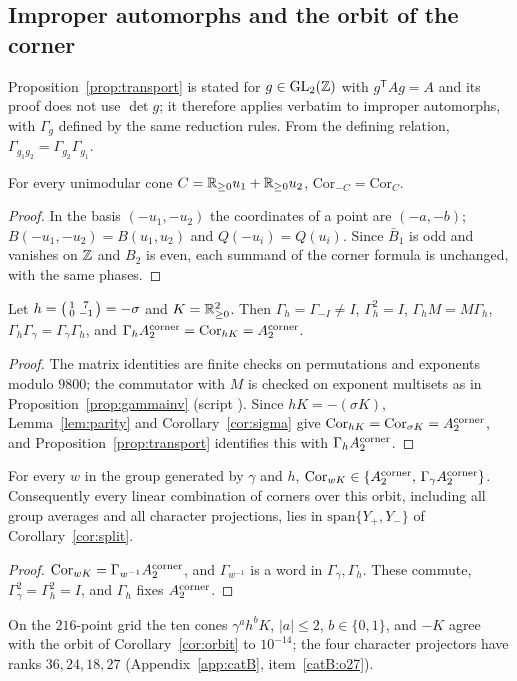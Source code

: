 \subsection{Improper automorphs and the orbit of the corner}\label{sec:improper}
Proposition~\ref{prop:transport} is stated for $g\in\mathrm{GL}_2(\mathbb{Z})$ with $g^{\mathsf T}Ag=A$ and its proof does not use $\det g$; it therefore applies verbatim to improper automorphs, with
$\Gamma_g$ defined by the same reduction rules. From the defining relation, $\Gamma_{g_1g_2}=\Gamma_{g_2}\Gamma_{g_1}$.
\begin{lemma}\label{lem:parity}
For every unimodular cone $C=\mathbb{R}_{\ge0}u_1+\mathbb{R}_{\ge0}u_2$, $\mathrm{Cor}_{-C}=\mathrm{Cor}_C$.
\end{lemma}
\begin{proof}
In the basis $(-u_1,-u_2)$ the coordinates of a point are $(-a,-b)$; $B(-u_1,-u_2)=B(u_1,u_2)$ and $Q(-u_i)=Q(u_i)$. Since $\bar B_1$ is odd and vanishes on $\mathbb{Z}$ and $B_2$ is even, each
summand of the corner formula is unchanged, with the same phases.
\end{proof}
\begin{proposition}\label{prop:improper}
Let $h=\begin{psmallmatrix}1&7\\0&-1\end{psmallmatrix}=-\sigma$ and $K=\mathbb{R}_{\ge0}^2$. Then $\Gamma_h=\Gamma_{-I}\neq I$, $\Gamma_h^2=I$, $\Gamma_hM=M\Gamma_h$, $\Gamma_h\Gamma_\gamma=\Gamma_\gamma\Gamma_h$, and
$\Gamma_h A_2^{\rm corner}=\mathrm{Cor}_{hK}=A_2^{\rm corner}$.
\end{proposition}
\begin{proof}
The matrix identities are finite checks on permutations and exponents modulo $9800$; the commutator with $M$ is checked on exponent multisets as in Proposition~\ref{prop:gammainv}
(script ). Since $hK=-(\sigma K)$, Lemma~\ref{lem:parity} and Corollary~\ref{cor:sigma} give $\mathrm{Cor}_{hK}=\mathrm{Cor}_{\sigma K}=A_2^{\rm corner}$, and
Proposition~\ref{prop:transport} identifies this with $\Gamma_hA_2^{\rm corner}$.
\end{proof}
\begin{corollary}\label{cor:orbit}
For every $w$ in the group generated by $\gamma$ and $h$, $\mathrm{Cor}_{wK}\in\{A_2^{\rm corner},\,\Gamma_\gamma A_2^{\rm corner}\}$. Consequently every linear combination of corners over this
orbit, including all group averages and all character projections, lies in $\mathrm{span}\{Y_+,Y_-\}$ of Corollary~\ref{cor:split}.
\end{corollary}
\begin{proof}
$\mathrm{Cor}_{wK}=\Gamma_{w^{-1}}A_2^{\rm corner}$, and $\Gamma_{w^{-1}}$ is a word in $\Gamma_\gamma,\Gamma_h$. These commute, $\Gamma_\gamma^2=\Gamma_h^2=I$, and $\Gamma_h$ fixes $A_2^{\rm corner}$.
\end{proof}
\begin{catbremark}
On the $216$-point grid the ten cones $\gamma^ah^bK$, $|a|\le2$, $b\in\{0,1\}$, and $-K$ agree with the orbit of Corollary~\ref{cor:orbit} to $10^{-14}$; the four character projectors
have ranks $36,24,18,27$ (Appendix~\ref{app:catB}, item~\ref{catB:o27}).
\end{catbremark}
